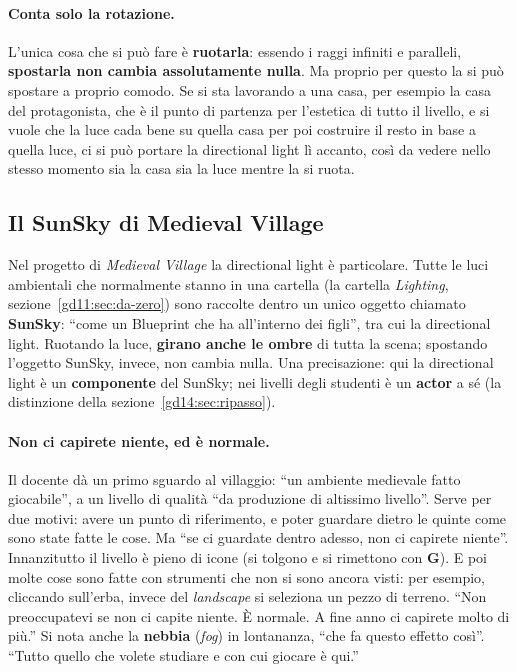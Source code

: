 \paragraph{Conta solo la rotazione.} L'unica cosa che si può fare è
\textbf{ruotarla}: essendo i raggi infiniti e paralleli, \textbf{spostarla non cambia
assolutamente nulla}. Ma proprio per questo la si può spostare a proprio comodo.
Se si sta lavorando a una casa, per esempio la casa del protagonista, che è il
punto di partenza per l'estetica di tutto il livello, e si vuole che la luce cada
bene su quella casa per poi costruire il resto in base a quella luce, ci si può
portare la directional light lì accanto, così da vedere nello stesso momento sia
la casa sia la luce mentre la si ruota.

\subsection{Il SunSky di Medieval Village}

Nel progetto di \emph{Medieval Village} la directional light è particolare. Tutte
le luci ambientali che normalmente stanno in una cartella (la cartella
\emph{Lighting}, sezione~\ref{gd11:sec:da-zero}) sono raccolte dentro un unico
oggetto chiamato \textbf{SunSky}: ``come un Blueprint che ha all'interno dei
figli'', tra cui la directional light. Ruotando la luce, \textbf{girano anche le
ombre} di tutta la scena; spostando l'oggetto SunSky, invece, non cambia nulla.
Una precisazione: qui la directional light è un \textbf{componente} del SunSky; nei
livelli degli studenti è un \textbf{actor} a sé (la distinzione della
sezione~\ref{gd14:sec:ripasso}).

\paragraph{Non ci capirete niente, ed è normale.} Il docente dà un primo sguardo al
villaggio: ``un ambiente medievale fatto giocabile'', a un livello di qualità ``da
produzione di altissimo livello''. Serve per due motivi: avere un punto di
riferimento, e poter guardare dietro le quinte come sono state fatte le cose. Ma
``se ci guardate dentro adesso, non ci capirete niente''. Innanzitutto il livello è
pieno di icone (si tolgono e si rimettono con \textbf{G}). E poi molte cose sono
fatte con strumenti che non si sono ancora visti: per esempio, cliccando sull'erba,
invece del \emph{landscape} si seleziona un pezzo di terreno. ``Non preoccupatevi
se non ci capite niente. È normale. A fine anno ci capirete molto di più.'' Si nota
anche la \textbf{nebbia} (\emph{fog}) in lontananza, ``che fa questo effetto così''.
``Tutto quello che volete studiare e con cui giocare è qui.''

